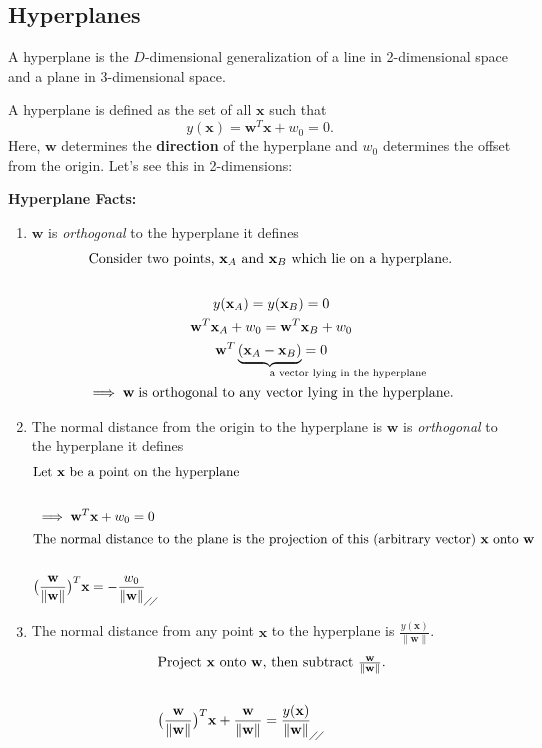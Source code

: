 \documentclass[11pt]{article}
\newcommand{\xb}{\mathbf{x}}
\begin{document}
\subsection{Hyperplanes}
A hyperplane is the $D$-dimensional generalization of a line in 2-dimensional space and a plane in 3-dimensional space.

A hyperplane is defined as the set of all $\xb$ such that
\begin{equation*}
	y(\xb) = \mathbf{w}^T \xb + w_0 = 0.
\end{equation*}
Here, $\mathbf{w}$ determines the \textbf{direction} of the hyperplane and $w_0$ determines the offset from the origin. Let's see this in 2-dimensions:

\textbf{Hyperplane Facts:}
\begin{enumerate}
\item $\mathbf{w}$ is \textit{orthogonal} to the hyperplane it defines
\begin{gather*}
	\intertext{Consider two points, $\xb_A$ and $\xb_B$ which lie on a hyperplane.}  \\
	y(\xb_A) = y(\xb_B)  = 0 \\
	\mathbf{w}^T \xb_A + w_0 = \mathbf{w}^T \xb_B + w_0 \\
	\mathbf{w}^T \underbrace{(\xb_A - \xb_B)}_{\mathrlap{\text{a vector lying in the hyperplane}}} = 0 \\
	\implies  \mathbf{w} \; \text{is orthogonal to any vector lying in the hyperplane.}
\end{gather*}

\item The normal distance from the origin to the hyperplane is $\mathbf{w}$ is \textit{orthogonal} to the hyperplane it defines
\begin{gather*}
	\intertext{Let $\xb$ be a point on the hyperplane}  \\
	\implies \mathbf{w}^T \xb + w_0 = 0 \\
	\intertext{The normal distance to the plane is the projection of this (arbitrary vector) $\xb$ onto $\mathbf{w}$} \\
	\bigl( \frac{\mathbf{w}}{\lVert\mathbf{w}\rVert} \bigr)^T \xb  = - \frac{w_0}{\lVert\mathbf{w}\rVert} _{\!\diagup\!\!\diagup}
\end{gather*}

\item The normal distance from any point $\xb$ to the hyperplane is $\frac{y(\xb)}{\lVert \mathbf{w} \rVert}$.
\begin{gather*}
	\intertext{Project $\xb$ onto $\mathbf{w}$, then subtract $\frac{\mathbf{w}}{\lVert\mathbf{w}\rVert}$.}  \\
	\bigl( \frac{\mathbf{w}}{\lVert\mathbf{w}\rVert} \bigr)^T \xb + \frac{\mathbf{w}}{\lVert\mathbf{w}\rVert} = \frac{y(\xb)}{\lVert\mathbf{w}\rVert}_{\!\diagup\!\!\diagup}
\end{gather*}
\end{enumerate}
\end{document}
